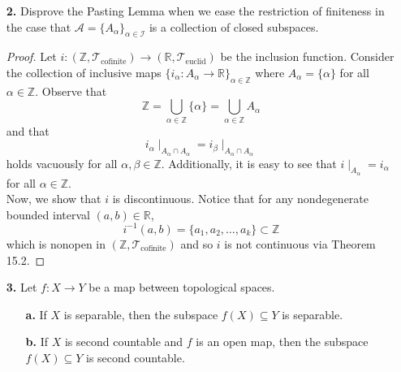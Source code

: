 \documentclass[ 12pt ]{article}
\begin{document}
\begin{enumerate}
\begin{proof}
\begin{enumerate}
					Let us now show that $f$ is a continuous map. Consider a closed subset $V \subseteq Y$. Observe that $$f^{-1}(V) = f^{-1}(V) \cap X = f^{-1}(V) \cap \bigcup_{
					\alpha \in \mathcal{I}} A_\alpha = \bigcup_{\alpha \in \mathcal{I}} f^{-1}(V) \cap A_\alpha = \bigcup_{\alpha \in \mathcal{I}} f^{-1} \mid_{A_\alpha}(V) =
					\bigcup_{\alpha \in \mathcal{I}} f_\alpha^{-1}(V).$$ By Theorem 16.1.1 it follows that $f_\alpha^{-1}(V)$ is closed in $A_\alpha$ since $f_\alpha$ is continuous
					for all $\alpha \in \mathcal{I}$. Furthermore, due to the assumption that $A_\alpha$ is closed in $X$, we can see that $f_\alpha^{-1}(V) \subseteq X$ is closed
					in $X$ via \textbf{1a}. Hence, $$\bigcup_{\alpha \in \mathcal{I}} f_\alpha^{-1}(V) = f^{-1}(V)$$ is closed in $X$ and so $f$ is continuous by Theorem 16.1.1.
			\end{enumerate}
		\end{proof}


	\item[\textbf{2.}] Disprove the Pasting Lemma when we ease the restriction of finiteness in the case that $\mathcal{A} = \{ A_\alpha \}_{\alpha \in \mathcal{I}}$ is a collection of
		closed subspaces.

		\begin{proof}
			Let $i : (\mathbb{Z}, \mathcal{T}_\mathrm{cofinite}) \to (\mathbb{R}, \mathcal{T}_\mathrm{euclid})$ be the inclusion function. Consider the collection of inclusive maps
			$\{ i_\alpha : A_\alpha \to \mathbb{R} \}_{\alpha \in \mathbb{Z}}$ where $A_\alpha = \{\alpha\}$ for all $\alpha \in \mathbb{Z}$. Observe that $$\mathbb{Z} = \bigcup_{
			\alpha \in \mathbb{Z}} \{\alpha\} = \bigcup_{\alpha \in \mathbb{Z}} A_\alpha$$ and that $$i_\alpha \mid_{A_\alpha \cap A_\alpha} = i_\beta \mid_{A_\alpha \cap A_\alpha}$$
			holds vacuously for all $\alpha, \beta \in \mathbb{Z}$. Additionally, it is easy to see that $i\mid_{A_\alpha} = i_\alpha$ for all $\alpha \in \mathbb{Z}$. \\

			Now, we show that $i$ is discontinuous. Notice that for any nondegenerate bounded interval $(a, b) \in \mathbb{R}$, $$i^{-1}(a, b) = \{ a_1, a_2, \hdots, a_k \} \subset
			\mathbb{Z}$$ which is nonopen in $(\mathbb{Z}, \mathcal{T}_\mathrm{cofinite})$ and so $i$ is not continuous via Theorem 15.2.
		\end{proof}


	\item[\textbf{3.}] Let $f : X \to Y$ be a map between topological spaces.
		\begin{enumerate}
			\item[\textbf{a.}] If $X$ is separable, then the subspace $f(X) \subseteq Y$ is separable.
			\item[\textbf{b.}] If $X$ is second countable and $f$ is an open map, then the subspace $f(X) \subseteq Y$ is second countable.
		\end{enumerate}


\end{enumerate}
\end{document}
